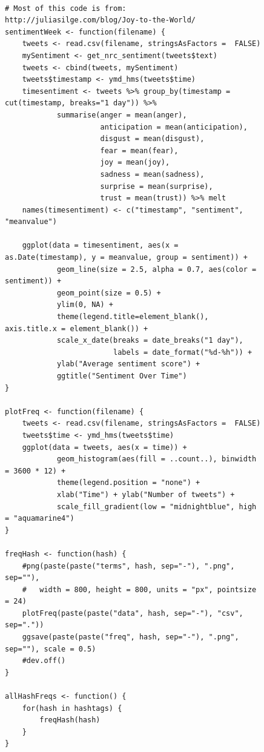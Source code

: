 \documentclass[prodmode]{acmsmall} %
\begin{document}
\begin{figure}[!t]
    \begin{lstlisting}

# Most of this code is from: http://juliasilge.com/blog/Joy-to-the-World/
sentimentWeek <- function(filename) {
	tweets <- read.csv(filename, stringsAsFactors =  FALSE)
	mySentiment <- get_nrc_sentiment(tweets$text)
	tweets <- cbind(tweets, mySentiment)
	tweets$timestamp <- ymd_hms(tweets$time)
	timesentiment <- tweets %>% group_by(timestamp = cut(timestamp, breaks="1 day")) %>% 
	        summarise(anger = mean(anger), 
	                  anticipation = mean(anticipation), 
	                  disgust = mean(disgust), 
	                  fear = mean(fear), 
	                  joy = mean(joy), 
	                  sadness = mean(sadness), 
	                  surprise = mean(surprise), 
	                  trust = mean(trust)) %>% melt
	names(timesentiment) <- c("timestamp", "sentiment", "meanvalue")

	ggplot(data = timesentiment, aes(x = as.Date(timestamp), y = meanvalue, group = sentiment)) +
	        geom_line(size = 2.5, alpha = 0.7, aes(color = sentiment)) +
	        geom_point(size = 0.5) +
	        ylim(0, NA) +
	        theme(legend.title=element_blank(), axis.title.x = element_blank()) +
	        scale_x_date(breaks = date_breaks("1 day"), 
	                     labels = date_format("%d-%h")) +
	        ylab("Average sentiment score") + 
	        ggtitle("Sentiment Over Time")
}

plotFreq <- function(filename) {
	tweets <- read.csv(filename, stringsAsFactors =  FALSE)
	tweets$time <- ymd_hms(tweets$time)
	ggplot(data = tweets, aes(x = time)) +
	        geom_histogram(aes(fill = ..count..), binwidth = 3600 * 12) +
	        theme(legend.position = "none") +
	        xlab("Time") + ylab("Number of tweets") + 
	        scale_fill_gradient(low = "midnightblue", high = "aquamarine4")
}

freqHash <- function(hash) {
	#png(paste(paste("terms", hash, sep="-"), ".png", sep=""), 
	#	width = 800, height = 800, units = "px", pointsize = 24)
	plotFreq(paste(paste("data", hash, sep="-"), "csv", sep="."))
	ggsave(paste(paste("freq", hash, sep="-"), ".png", sep=""), scale = 0.5)
	#dev.off()
}

allHashFreqs <- function() {
	for(hash in hashtags) {
		freqHash(hash)
	}
}
\end{lstlisting}
  \end{figure}
\end{document}
